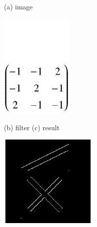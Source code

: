 \documentclass[10pt]{article}
\begin{document}
(a) image

\includegraphics[max width=\textwidth]{2022_01_06_b5ce182ed1bd5f482e5bg-10(5)}

(b) filter (c) result

\includegraphics[max width=\textwidth]{2022_01_06_b5ce182ed1bd5f482e5bg-10(6)}
\end{document}

